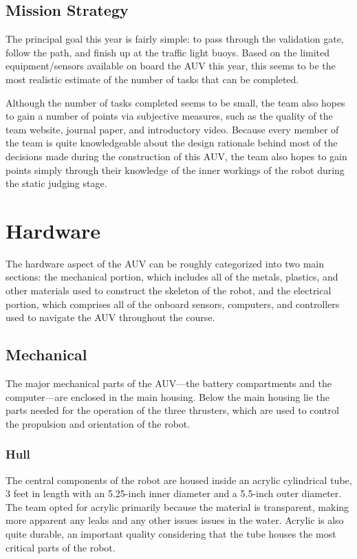 \documentclass[12pt, letterpaper, twocolumn, titlepage]{article}
\begin{document}
\subsection{Mission Strategy}
The principal goal this year is fairly simple: to pass through the validation gate, follow the path, and finish up at the traffic light buoys. Based on the limited equipment/sensors available on board the AUV this year, this seems to be the most realistic estimate of the number of tasks that can be completed.

Although the number of tasks completed seems to be small, the team also hopes to gain a number of points via subjective measures, such as the quality of the team website, journal paper, and introductory video. Because every member of the team is quite knowledgeable about the design rationale behind most of the decisions made during the construction of this AUV, the team also hopes to gain points simply through their knowledge of the inner workings of the robot during the static judging stage.

\section{Hardware}

The hardware aspect of the AUV can be roughly categorized into two main sections: the mechanical portion, which includes all of the metals, plastics, and other materials used to construct the skeleton of the robot, and the electrical portion, which comprises all of the onboard sensors, computers, and controllers used to navigate the AUV throughout the course.

\subsection{Mechanical}

The major mechanical parts of the AUV—the battery compartments and the computer—are enclosed in the main housing. Below the main housing lie the parts needed for the operation of the three thrusters, which are used to control the propulsion and orientation of the robot.

\subsubsection{Hull}

The central components of the robot are housed inside an acrylic cylindrical tube, 3 feet in length with an 5.25-inch inner diameter and a 5.5-inch outer diameter. The team opted for acrylic primarily because the material is transparent, making more apparent any leaks and any other issues issues in the water. Acrylic is also quite durable, an important quality considering that the tube houses the most critical parts of the robot.
\end{document}
